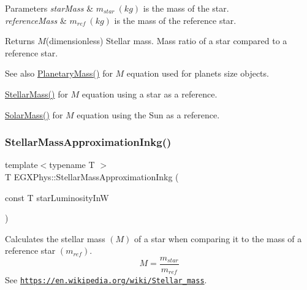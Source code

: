 \begin{DoxyParams}{Parameters}
{\em star\+Mass} & $m_{star}\ (kg)$ is the mass of the star. \\
\hline
{\em reference\+Mass} & $m_{ref}\ (kg)$ is the mass of the reference star. \\
\hline
\end{DoxyParams}
\begin{DoxyReturn}{Returns}
$M$(dimensionless) Stellar mass. Mass ratio of a star compared to a reference star. 
\end{DoxyReturn}
\begin{DoxySeeAlso}{See also}
\mbox{\hyperlink{group___e_g_x_phys-_planetary_mass_ga225bcf56fb37468f6d4d46493d403503}{Planetary\+Mass()}} for $M$ equation used for planets size objects. 

\mbox{\hyperlink{group___e_g_x_phys-_stellar_mass_ga6c1b42cfd62e3174709ddbf15a87b460}{Stellar\+Mass()}} for $M$ equation using a star as a reference. 

\mbox{\hyperlink{group___e_g_x_phys-_stellar_mass_ga4988f903a27ec9cfa63f72b003d876fd}{Solar\+Mass()}} for $M$ equation using the Sun as a reference. 
\end{DoxySeeAlso}
\mbox{\label{group___e_g_x_phys-_stellar_mass_ga1863cc210a7e0aa0c681774e719fcd21}} 
\subsubsection{\texorpdfstring{Stellar\+Mass\+Approximation\+Inkg()}{StellarMassApproximationInkg()}}
{\footnotesize\ttfamily template$<$typename T $>$ \\
T E\+G\+X\+Phys\+::\+Stellar\+Mass\+Approximation\+Inkg (\begin{DoxyParamCaption}\item[{const T}]{star\+Luminosity\+InW }\end{DoxyParamCaption})}



Calculates the stellar mass $(M)$ of a star when comparing it to the mass of a reference star $(m_{ref})$. \[M=\frac{m_{star}}{m_{ref}}\] See \href{https://en.wikipedia.org/wiki/Stellar_mass}{\tt https\+://en.\+wikipedia.\+org/wiki/\+Stellar\+\_\+mass}. 


